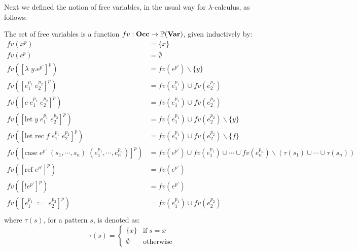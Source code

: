\documentclass[../../master.tex]{subfiles}
\begin{document}
Next we defined the notion of free variables, in the usual way for $\lambda$-calculus, as follows:
\begin{definition}\label{def:fv}
	The set of free variables is a function $fv:\textbf{Occ}\rightarrow\mathbb{P}(\textbf{Var})$, given inductively by:
	\begin{align*}
		fv(x^p)&=\{x\}\\
		fv(c^p)&=\emptyset\\
		fv([\lambda\;y.e^{p'}]^p)&=fv(e^{p'})\backslash\{y\}\\
		fv([e_1^{p_1}\;e_2^{p_2}]^p)&=fv(e_1^{p_1})\cup fv(e_2^{p_2})\\
		fv([c\;e_1^{p_1}\;e_2^{p_2}]^p)&=fv(e_1^{p_1})\cup fv(e_2^{p_2})\\
		fv([\mbox{let}\;y\;e_1^{p_1}\;e_2^{p_2}]^p)&=fv(e_1^{p_1})\cup fv(e_2^{p_2})\backslash\{y\}\\
		fv([\mbox{let rec}\;f\;e_1^{p_1}\;e_2^{p_2}]^p)&=fv(e_1^{p_1})\cup fv(e_2^{p_2})\backslash\{f\}\\
		fv([\mbox{case}\;e^{p'}\;(s_1,\cdots,s_n)\;(e_1^{p_1},\cdots,e_n^{p_n})]^p)&=fv(e^{p'})\cup fv(e_1^{p_1})\cup\cdots\cup fv(e_n^{p_n})\backslash(\tau(s_1)\cup\cdots\cup\tau(s_n))\\
		fv([\mbox{ref}\;e^{p'}]^p)&=fv(e^{p'})\\
		fv([!e^{p'}]^p)&=fv(e^{p'})\\
		fv([e_1^{p_1}\;:=\;e_2^{p_2}]^p)&=fv(e_1^{p_1})\cup fv(e_2^{p_2})\\
	\end{align*}
	where $\tau(s)$, for a pattern $s$, is denoted as:
	$$
	\tau(s)=
		\left\{\begin{matrix}
			\{x\} & \mbox{if}\;s=x\\ 
			\emptyset & \mbox{otherwise}
		\end{matrix}\right.
	$$
\end{definition}
\end{document}
